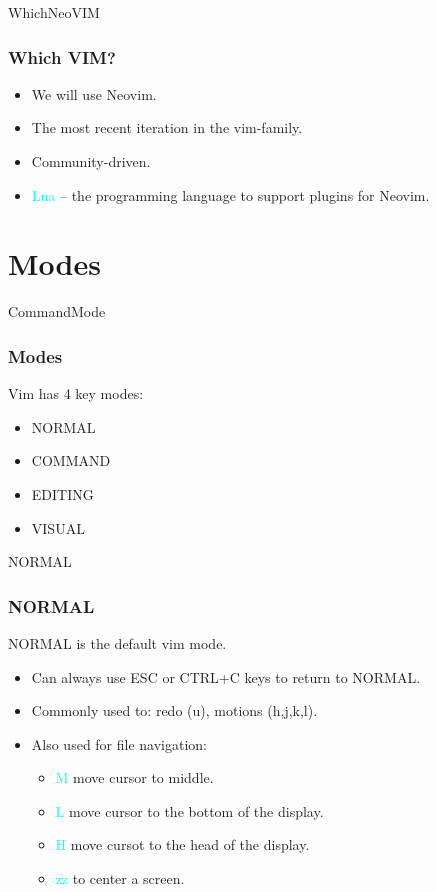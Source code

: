 \documentclass{beamer}
\newcommand{\highlight}[1]{\textcolor{cyan}{\textsf{#1}}}
\begin{document}
\begin{frame}{WhichNeoVIM}
    \frametitle{Which VIM?}
    \begin{itemize}
        \item We will use Neovim.
        \item The most recent iteration in the vim-family.
        \item Community-driven.
        \item \highlight{Lua} -- the programming language to support plugins for Neovim.
    \end{itemize}
\end{frame}

\section{Modes}
\begin{frame}{CommandMode}
    \frametitle{Modes}
    Vim has 4 key modes:
    \begin{itemize}
        \item NORMAL
        \item COMMAND
        \item EDITING
        \item VISUAL
    \end{itemize}
\end{frame}

\begin{frame}{NORMAL}
    \frametitle{NORMAL}
    NORMAL is the default vim mode.
    \begin{itemize}
        \item Can always use ESC or CTRL+C keys to return to NORMAL.
        \item Commonly used to: redo (u), motions (h,j,k,l).
        \item Also used for file navigation:
            \begin{itemize}
                \item \highlight{M} move cursor to middle.
                \item \highlight{L} move cursor to the bottom of the display.
                \item \highlight{H} move cursot to the head of the display.
                \item \highlight{zz} to center a screen.
            \end{itemize}
    \end{itemize}
\end{frame}
\end{document}

